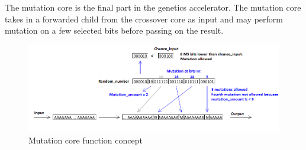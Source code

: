 The mutation core is the final part in the genetics accelerator. 
The mutation core takes in a forwarded child from the crossover core as input and may perform mutation on a few selected bits before passing on the result. 

\begin{figure}[H]
\includegraphics[width=\textwidth]{fpga/fig/mutation.png}
\caption{Mutation core function concept}
\label{Fig_Mutation}
\end{figure}

